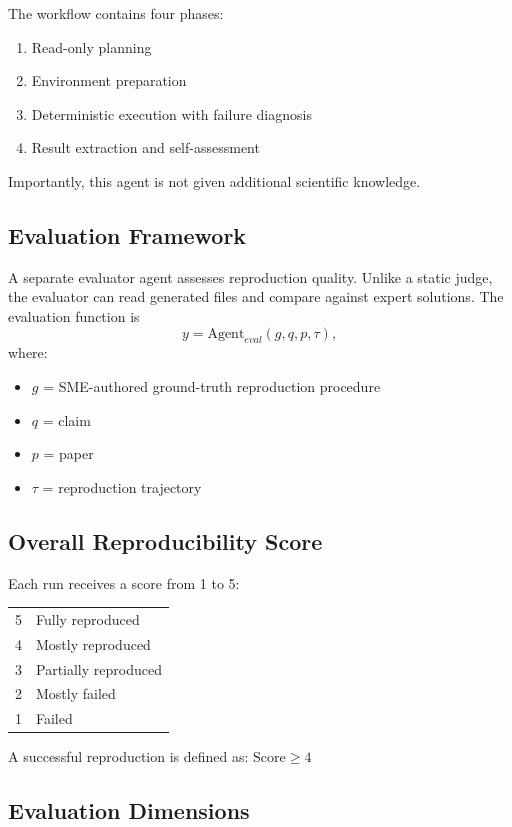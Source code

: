 \documentclass[11pt]{article}
\begin{document}
The workflow contains four phases:
\begin{enumerate}
    \item Read-only planning
    \item Environment preparation
    \item Deterministic execution with failure diagnosis
    \item Result extraction and self-assessment
\end{enumerate}
Importantly, this agent is not given additional scientific knowledge.

\subsection*{Evaluation Framework}

A separate evaluator agent assesses reproduction quality.
Unlike a static judge, the evaluator can read generated files and compare against expert solutions.
The evaluation function is
\[y=\text{Agent}_{eval}(g,q,p,\tau),\]
where:

\begin{itemize}
    \item $g$ = SME-authored ground-truth reproduction procedure
    \item $q$ = claim
    \item $p$ = paper
    \item $\tau$ = reproduction trajectory
\end{itemize}

\subsection*{Overall Reproducibility Score}

Each run receives a score from 1 to 5:

\begin{center}
\begin{tabular}{cl}
5 & Fully reproduced \\
4 & Mostly reproduced \\
3 & Partially reproduced \\
2 & Mostly failed \\
1 & Failed
\end{tabular}
\end{center}

A successful reproduction is defined as: $\text{Score}\ge4$

\subsection*{Evaluation Dimensions}
\end{document}
